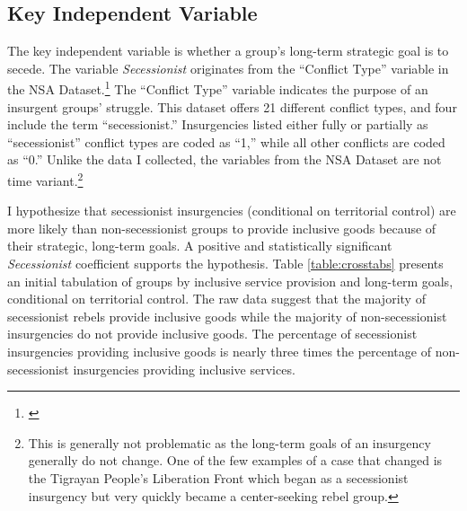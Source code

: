 \documentclass[12pt, letterpaper]{article}
\begin{document}

\subsection*{Key Independent Variable}

The key independent variable is whether a group's long-term strategic goal is to secede. The variable \textit{Secessionist} originates from the ``Conflict Type'' variable in the NSA Dataset.\footnote{\citealt{cunningham2009takes}} The ``Conflict Type'' variable indicates the purpose of an insurgent groups' struggle. This dataset offers 21 different conflict types, and four include the term ``secessionist.'' Insurgencies listed either fully or partially as ``secessionist'' conflict types are coded as ``1,'' while all other conflicts are coded as ``0.'' Unlike the data I collected, the variables from the NSA Dataset are not time variant.\footnote{This is generally not problematic as the long-term goals of an insurgency generally do not change. One of the few examples of a case that changed is the Tigrayan People's Liberation Front which began as a secessionist insurgency but very quickly became a center-seeking rebel group.} 


I hypothesize that secessionist insurgencies (conditional on territorial control) are more likely than non-secessionist groups to provide inclusive goods because of their strategic, long-term goals. A positive and statistically significant \textit{Secessionist} coefficient supports the hypothesis. Table \ref{table:crosstabs} presents an initial tabulation of groups by inclusive service provision and long-term goals, conditional on territorial control. The raw data suggest that the majority of secessionist rebels provide inclusive goods while the majority of non-secessionist insurgencies do not provide inclusive goods. The percentage of secessionist insurgencies providing inclusive goods is nearly three times the percentage of non-secessionist insurgencies providing inclusive services.
\end{document}
